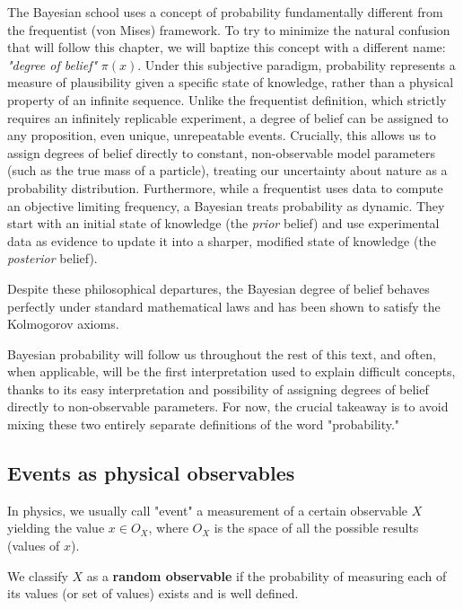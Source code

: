 The Bayesian school uses a concept of probability fundamentally different from the frequentist (von Mises) framework. To try to minimize the natural confusion that will follow this chapter, we will baptize this concept with a different name: \emph{"degree of belief"} $\pi(x)$. 
Under this subjective paradigm, probability represents a measure of plausibility given a specific state of knowledge, rather than a physical property of an infinite sequence. 
Unlike the frequentist definition, which strictly requires an infinitely replicable experiment, a degree of belief can be assigned to any proposition, even unique, unrepeatable events. Crucially, this allows us to assign degrees of belief directly to constant, non-observable model parameters (such as the true mass of a particle), treating our uncertainty about nature as a probability distribution.
Furthermore, while a frequentist uses data to compute an objective limiting frequency, a Bayesian treats probability as dynamic. They start with an initial state of knowledge (the \emph{prior} belief) and use experimental data as evidence to update it into a sharper, modified state of knowledge (the \emph{posterior} belief).

Despite these philosophical departures, the Bayesian degree of belief behaves perfectly under standard mathematical laws and has been shown to satisfy the Kolmogorov axioms. 

Bayesian probability will follow us throughout the rest of this text, and often, when applicable, will be the first interpretation used to explain difficult concepts, thanks to its easy interpretation and possibility of assigning degrees of belief directly to non-observable parameters. For now, the crucial takeaway is to avoid mixing these two entirely separate definitions of the word "probability."

\subsection{Events as physical observables}
\label{subsec:observables}

In physics, we usually call "event" a measurement of a certain observable $X$ yielding the value $x\in O_X$, where $O_X$ is the space of all the possible results (values of $x$). 


We classify $X$ as a \textbf{random observable} if the probability of measuring each of its values (or set of values) exists and is well defined. 

